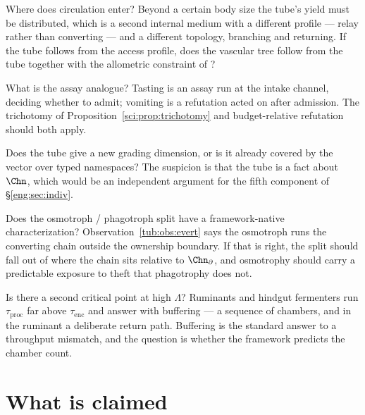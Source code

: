 \begin{question}
Where does circulation enter? Beyond a certain body size the tube's yield must
be distributed, which is a second internal medium with a different profile ---
relay rather than converting --- and a different topology, branching and
returning. If the tube follows from the access profile, does the vascular tree
follow from the tube together with the allometric constraint of \cite{west}?
\end{question}

\begin{question}
What is the assay analogue? Tasting is an assay run at the intake channel,
deciding whether to admit; vomiting is a refutation acted on after admission.
The trichotomy of Proposition~\ref{sci:prop:trichotomy} and budget-relative
refutation should both apply.
\end{question}

\begin{question}
Does the tube give a new grading dimension, or is it already covered by the
vector over typed namespaces? The suspicion is that the tube is a fact about
$\Chn$, which would be an independent argument for the fifth component of
\S\ref{eng:sec:indiv}.
\end{question}

\begin{question}
Does the osmotroph / phagotroph split have a framework-native characterization?
Observation~\ref{tub:obs:evert} says the osmotroph runs the converting chain
outside the ownership boundary. If that is right, the split should fall out of
where the chain sits relative to $\Chn_{\partial}$, and osmotrophy should carry
a predictable exposure to theft that phagotrophy does not.
\end{question}

\begin{question}
Is there a second critical point at high $\Lambda$? Ruminants and hindgut
fermenters run $\tau_{\mathrm{proc}}$ far above $\tau_{\mathrm{enc}}$ and answer
with buffering --- a sequence of chambers, and in the ruminant a deliberate
return path. Buffering is the standard answer to a throughput mismatch, and the
question is whether the framework predicts the chamber count.
\end{question}

\section{What is claimed}
\label{tub:sec:claimed}

